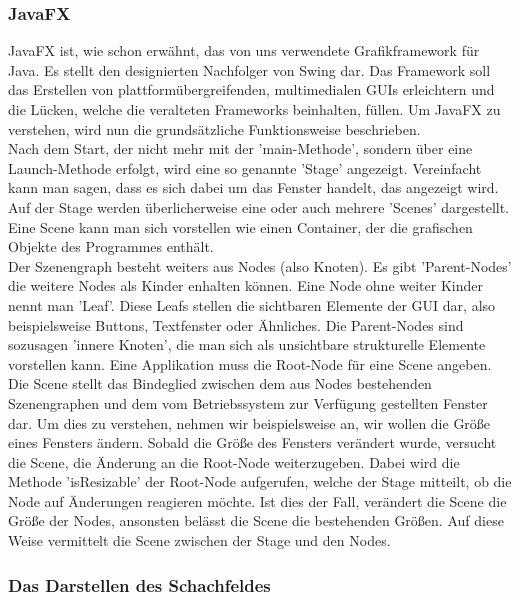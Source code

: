 \documentclass[12pt,a4paper]{article}
\begin{document}
\subsubsection{JavaFX}
\label{SUBSUBSEC:JAVAFX}
JavaFX ist, wie schon erwähnt, das von uns verwendete Grafikframework für Java. Es stellt den designierten Nachfolger von Swing dar. Das Framework soll das Erstellen von plattformübergreifenden, multimedialen GUIs erleichtern und die Lücken, welche die veralteten Frameworks beinhalten, füllen.
Um JavaFX zu verstehen, wird nun die grundsätzliche Funktionsweise beschrieben.\\ [2ex]
Nach dem Start, der nicht mehr mit der 'main-Methode', sondern über eine Launch-Methode erfolgt, wird eine so genannte 'Stage' angezeigt. Vereinfacht kann man sagen, dass es sich dabei um das Fenster handelt, das angezeigt wird.\\
Auf der Stage werden überlicherweise eine oder auch mehrere 'Scenes' dargestellt. Eine Scene kann man sich vorstellen wie einen Container, der die grafischen Objekte des Programmes enthält. \\
Der Szenengraph besteht weiters aus Nodes (also Knoten). Es gibt 'Parent-Nodes' die weitere Nodes als Kinder enhalten können. Eine Node ohne weiter Kinder nennt man 'Leaf'. Diese Leafs stellen die sichtbaren Elemente der GUI dar, also beispielsweise Buttons, Textfenster oder Ähnliches. Die Parent-Nodes sind sozusagen 'innere Knoten', die man sich als unsichtbare strukturelle Elemente vorstellen kann. Eine Applikation muss die Root-Node für eine Scene angeben. \\
Die Scene stellt das Bindeglied zwischen dem aus Nodes bestehenden Szenengraphen und dem vom Betriebssystem zur Verfügung gestellten Fenster dar. Um dies zu verstehen, nehmen wir beispielsweise an, wir wollen die Größe eines Fensters ändern. Sobald die Größe des Fensters verändert wurde, versucht die Scene, die Änderung an die Root-Node weiterzugeben. Dabei wird die Methode 'isResizable' der Root-Node aufgerufen, welche der Stage mitteilt, ob die Node auf Änderungen reagieren möchte. Ist dies der Fall, verändert die Scene die Größe der Nodes, ansonsten belässt die Scene die bestehenden Größen. Auf diese Weise vermittelt die Scene zwischen der Stage und den Nodes. 

\subsubsection{Das Darstellen des Schachfeldes}
\label{SUBSUBSEC:BOARDGUI}
\end{document}
